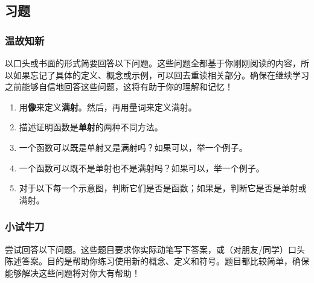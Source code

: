 
\subsection{习题}

\subsubsection*{温故知新}

以口头或书面的形式简要回答以下问题。这些问题全都基于你刚刚阅读的内容，所以如果忘记了具体的定义、概念或示例，可以回去重读相关部分。确保在继续学习之前能够自信地回答这些问题，这将有助于你的理解和记忆！

\begin{enumerate}[label=(\arabic*)]
    \item 用\textbf{像}来定义\textbf{满射}。然后，再用量词来定义满射。
    \item 描述证明函数是\textbf{单射}的两种不同方法。
    \item 一个函数可以既是单射又是满射吗？如果可以，举一个例子。
    \item 一个函数可以既不是单射也不是满射吗？如果可以，举一个例子。
    \item 对于以下每一个示意图，判断它们是否是函数；如果是，判断它是否是单射或满射。
\end{enumerate}

\subsubsection*{小试牛刀}

尝试回答以下问题。这些题目要求你实际动笔写下答案，或（对朋友/同学）口头陈述答案。目的是帮助你练习使用新的概念、定义和符号。题目都比较简单，确保能够解决这些问题将对你大有帮助！

